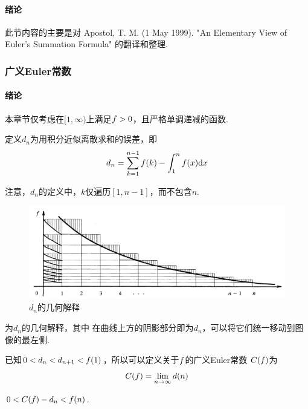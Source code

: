  \paragraph{绪论}
   此节内容的主要是对 Apostol, T. M. (1 May 1999).
   "An Elementary View of Euler's Summation Formula"
   的翻译和整理.

  \subsubsection{广义Euler常数}
    \paragraph{绪论}
      本章节仅考虑在$[1,\infty)$上满足$\mathnormal{f}>0$，且严格单调递减的函数.

    \begin{defi}[$d_n$]
      定义$d_n$为用积分近似离散求和的误差，即
      \begin{equation}
        \label{equ: d_n}
        d_n = \sum_{k=1}^{n-1}\mathnormal{f}(k) - \int_1^n\mathnormal{f}(x)\mathrm{d} x
      \end{equation}
    \end{defi}
    \remark
      注意，$d_n$的定义中，$k$仅遍历$[1, n-1]$，而不包含$n$.
      \begin{figure}[htbp]
        \centering
        \includegraphics[width=15cm]{../image/d_n.png}
        \caption{$d_n$的几何解释}
        \label{fig: d_n的几何解释}
      \end{figure}
      为$d_n$的几何解释，其中
      在曲线上方的阴影部分即为$d_n$，可以将它们统一移动到图像的最左侧.

    \begin{defi}[广义Euler常数]
      已知$0<d_n<d_{n+1}<\mathnormal{f}(1)$，所以可以定义关于$\mathnormal{f}$的广义Euler常数
      $C(\mathnormal{f})$为
      \[
        C(\mathnormal{f}) = \lim_{n\to\infty}d(n)
      \]
    \end{defi}

    \begin{pos}[余项估计]
      $0 < C(\mathnormal{f}) - d_n < \mathnormal{f}(n)$.
    \end{pos}


